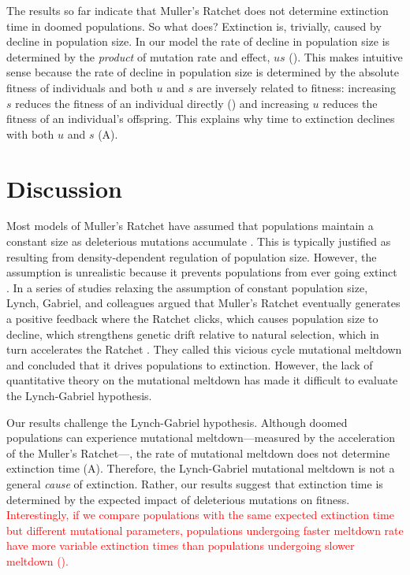 \documentclass[9pt,lineno]{elife}
\newcommand{\red}{\textcolor{red}}
\begin{document}
The results so far indicate that Muller's Ratchet does not determine extinction time in doomed populations.  So what does?
%
Extinction is, trivially, caused by decline in population size.  In our model the rate of decline in population size is determined by the \textit{product} of mutation rate and effect, $us$ ().  This makes intuitive sense because the rate of decline in population size is determined by the absolute fitness of individuals and both $u$ and $s$ are inversely related to fitness: 
increasing $s$ reduces the fitness of an individual directly () and increasing $u$ reduces the fitness of an individual's offspring.
%
This explains why time to extinction declines with both $u$ and $s$ (A).




\section{Discussion}




Most models of Muller's Ratchet have assumed that populations maintain a constant size as deleterious mutations accumulate \citep{Haigh_The_1978, Gessler_The_1995, Gordo_On_2000, gor00b, Rouzine_The_2003, met13}.
This is typically justified as resulting from density-dependent regulation of population size.  
However, the assumption is unrealistic because it prevents populations from ever going extinct \citep{Lynch_MUTATION_1990, mel91}.  
%
In a series of studies relaxing the assumption of constant population size, Lynch, Gabriel, and colleagues argued that Muller's Ratchet eventually generates a positive feedback where
the Ratchet clicks, 
which causes population size to decline, 
which strengthens genetic drift relative to natural selection,
which in turn accelerates the Ratchet \citep{Lynch_MUTATION_1990, lyn93, Gabriel_MULLER_1993}.  
They called this vicious cycle mutational meltdown and concluded that it drives populations to extinction.  
However, the lack of quantitative theory on the mutational meltdown has made it difficult to evaluate the Lynch-Gabriel hypothesis.

Our results challenge the Lynch-Gabriel hypothesis.  Although doomed populations can experience mutational meltdown---measured by the acceleration of the Muller's Ratchet---, the rate of mutational meltdown does not determine extinction time (A).  Therefore, the Lynch-Gabriel mutational meltdown is not a general \textit{cause} of extinction.  Rather, our results suggest that extinction time is determined by the expected impact of deleterious mutations on fitness.  
\red{Interestingly, if we compare populations with the same expected extinction time but different mutational parameters, populations undergoing faster meltdown rate have more variable extinction times than populations undergoing slower meltdown  ().}
\end{document}
